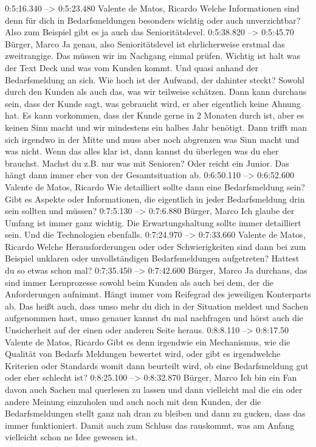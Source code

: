 0:5:16.340 --> 0:5:23.480
Valente de Matos, Ricardo
Welche Informationen sind denn für dich in Bedarfsmeldungen besonders wichtig oder auch unverzichtbar? Also zum Beispiel gibt es ja auch das Senioritätslevel.
0:5:38.820 --> 0:5:45.70
Bürger, Marco
Ja genau, also Senioritätslevel ist ehrlicherweise erstmal das zweitrangige. Das müssen wir im Nachgang einmal prüfen. Wichtig ist halt was der Text Deck und was vom Kunden kommt. Und quasi anhand der Bedarfsmeldung an sich. Wie hoch ist der Aufwand, der dahinter steckt? Sowohl durch den Kunden als auch das, was wir teilweise schätzen. Dann kann durchaus sein, dass der Kunde sagt, was gebraucht wird, er aber eigentlich keine Ahnung hat. Es kann vorkommen, dass der Kunde gerne in 2 Monaten durch ist, aber es keinen Sinn macht und wir mindestens ein halbes Jahr benötigt. Dann trifft man sich irgendwo in der Mitte und muss aber noch abgrenzen was Sinn macht und was nicht. Wenn das alles klar ist, dann kannst du überlegen was du eher brauchst. Machst du z.B. nur was mit Senioren? Oder reicht ein Junior. Das hängt dann immer eher von der Gesamtsituation ab.
0:6:50.110 --> 0:6:52.600
Valente de Matos, Ricardo
Wie detailliert sollte dann eine Bedarfsmeldung sein? Gibt es Aspekte oder Informationen, die eigentlich in jeder Bedarfsmeldung drin sein sollten und müssen?
0:7:5.130 --> 0:7:6.880
Bürger, Marco
Ich glaube der Umfang ist immer ganz wichtig. Die Erwartungshaltung sollte immer detailliert sein. Und die Technologien ebenfalls.
0:7:24.970 --> 0:7:33.660
Valente de Matos, Ricardo
Welche Herausforderungen oder oder Schwierigkeiten sind dann bei zum Beispiel unklaren oder unvollständigen Bedarfsmeldungen aufgetreten? Hattest du so etwas schon mal?
0:7:35.450 --> 0:7:42.600
Bürger, Marco
Ja durchaus, das sind immer Lernprozesse sowohl beim Kunden als auch bei dem, der die Anforderungen aufnimmt. Hängt immer vom Reifegrad des jeweiligen Konterparts ab. Das heißt auch, dass umso mehr du dich in der Situation meldest und Sachen aufgenommen hast, umso genauer kannst du mal nachfragen und hörst auch die Unsicherheit auf der einen oder anderen Seite heraus.
0:8:8.110 --> 0:8:17.50
Valente de Matos, Ricardo
Gibt es denn irgendwie ein Mechanismus, wie die Qualität von Bedarfs Meldungen bewertet wird, oder gibt es irgendwelche Kriterien oder Standards womit dann beurteilt wird, ob eine Bedarfsmeldung gut oder eher schlecht ist?
0:8:25.100 --> 0:8:32.870
Bürger, Marco
Ich bin ein Fan davon auch Sachen mal querlesen zu lassen und dann vielleicht mal die ein oder andere Meinung einzuholen und auch noch mit dem Kunden, der die Bedarfsmeldungen stellt ganz nah dran zu bleiben und dann zu gucken, dass das immer funktioniert. Damit auch zum Schluss das rauskommt, was am Anfang vielleicht schon ne Idee gewesen ist.
